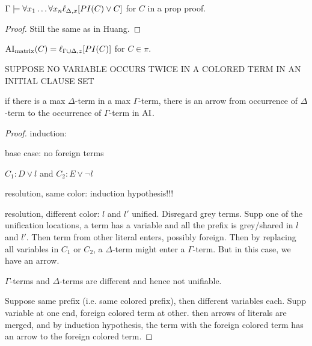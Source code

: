 \documentclass[,%
	paper=a4,%
	DIV14, 
	liststotoc,
	bibtotoc,
	draft=false,%
	numbers=noendperiod
]{scrartcl}
\begin{document}
\begin{lemma}
	$\Gamma \models \forall x_1 \ldots \forall x_n  \ell_{\Delta,x}[PI(C) \lor C]$ for $C$ in a prop proof.
	\label{structured2}
\end{lemma}
\begin{proof}
	Still the same as in Huang.
\end{proof}


\begin{lemma}
	\label{lemma:pi_ai_the_same}
	$\operatorname{AI}_\mathrm{matrix}(C) = \ell_{\Gamma\cup\Delta,z}[PI(C)]$ for $C \in \pi$.
\end{lemma}

SUPPOSE NO VARIABLE OCCURS TWICE IN A COLORED TERM IN AN INITIAL CLAUSE SET 

\begin{lemma}
	if there is a max $\Delta$-term in a max $\Gamma$-term, there is an arrow from occurrence of $\Delta$-term to the occurrence of $\Gamma$-term in $\operatorname{AI}$.
\end{lemma}
\begin{proof}

	induction:

	base case: no foreign terms

	$C_1: D \lor l$ and $C_2: E \lor \lnot l$

	resolution, same color: 
	induction hypothesis!!!

	resolution, different color: 
	$l$ and $l'$ unified. 
	Disregard grey terms.
	Supp one of the unification locations, a term has a variable and all the prefix is grey/shared in $l$ and $l'$.
	Then term from other literal enters, possibly foreign.
	Then by replacing all variables in $C_1$ or $C_2$, a $\Delta$-term might enter a $\Gamma$-term. But in this case, we have an arrow.

	$\Gamma$-terms and $\Delta$-terms are different and hence not unifiable.

	Suppose same prefix (i.e. same colored prefix), then different variables each. Supp variable at one end, foreign colored term at other.
	then arrows of literals are merged, and by induction hypothesis, the term with the foreign colored term has an arrow to the foreign colored term. 




\end{proof}
\end{document}
